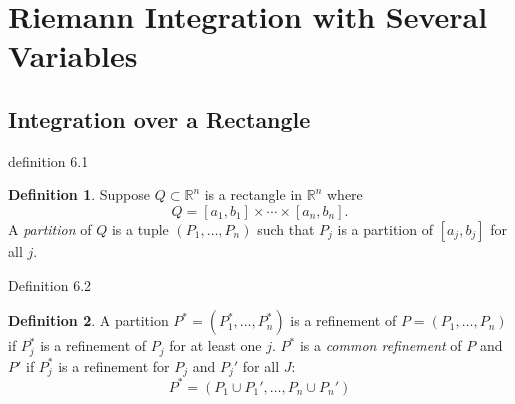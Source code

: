 \documentclass{article}
\newcommand{\R}{\mathbb{R}}
\theoremstyle{definition}
\newtheorem{definition}{Definition}[section]
\begin{document}
\section{Riemann Integration with Several Variables}
\subsection{Integration over a Rectangle}
definition 6.1
\begin{definition}
	Suppose $ Q\subset \R^n $ is a rectangle in $ \R^n $ where 
	$$ Q = [a_1,b_1]\times \cdots \times [a_n,b_n].$$
	A \textit{\color{red}partition} of $ Q $ is a tuple $ (P_1,\ldots,P_n) $ such that $ P_j $ is a partition of $ [a_j,b_j] $ for all $ j $. 
\end{definition}
Definition 6.2
\begin{definition}
	A partition $ P^*=(P_1^*,\ldots,P_n^*) $ is a refinement of $ P=(P_1,\ldots,P_n) $ if $ P_j^* $ is a refinement of $ P_j $ for at least one $ j $. $ P^* $ is a \textit{\color{red}common refinement} of $ P $ and $ P' $ if $ P_j^* $ is a refinement for $ P_j $ and $ P_j' $ for all $ J $:
	$$ P^*=(P_1\cup P_1', \ldots, P_n\cup P_n')$$
\end{definition}
\end{document}
